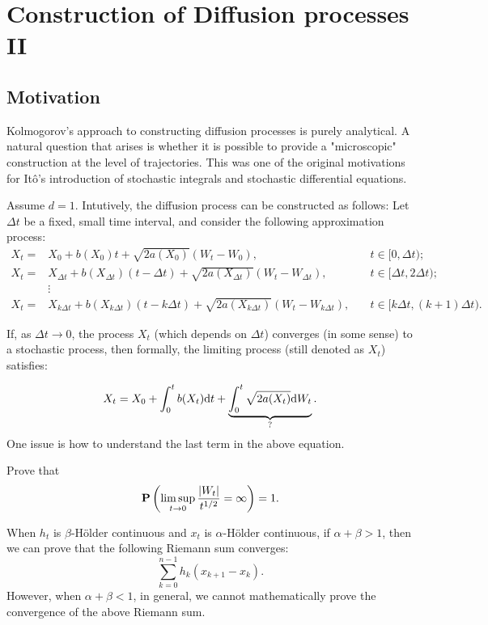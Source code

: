 \chapter{Construction of Diffusion processes II}


\section{Motivation} 
Kolmogorov's approach to constructing diffusion processes is purely analytical. A natural question that arises is whether it is possible to provide a "microscopic" construction at the level of trajectories. This was one of the original motivations for Itô's introduction of stochastic integrals and stochastic differential equations.

Assume \( d = 1 \). Intutively, the diffusion process can be constructed as follows: Let \( \Delta t \) be a fixed, small time interval, and consider the following approximation process: 
\begin{align*}
    X_t=&X_0+b(X_0)t+\sqrt{2a(X_0)}(W_t-W_0),&\quad t\in [0, \Delta t); \\
    X_t=&X_{\Delta t}+b(X_{\Delta t})(t-\Delta t)+\sqrt{2a(X_{\Delta t})}(W_t-W_{\Delta t}),&\quad t\in [\Delta t, 2 \Delta t); \\
    &\vdots\\
    X_t=&X_{k\Delta t}+b(X_{k\Delta t})(t-k\Delta t)+\sqrt{2a(X_{k\Delta t})}(W_t-W_{k \Delta t}),&\quad t\in [k\Delta t, (k+1)\Delta t). 
\end{align*}

If, as \(\Delta t \to 0\), the process \(X_t\) (which depends on \(\Delta t\)) converges (in some sense) to a stochastic process, then formally, the limiting process (still denoted as \(X_t\)) satisfies:

\begin{equation}\label{eq:sde0}
    X_t = X_0 + \int_0^t b(X_t) \text{\rm{d}} t + \underbrace{\int_0^t \sqrt{2a(X_t)} \text{\rm{d}} W_t}_{?}.
\end{equation}
One issue is how to understand the last term in the above equation. 

\begin{exercise}
    Prove that 
    \[
    {\mathbf P} \left( \limsup_{t\to 0}\frac{|W_t|}{t^{1/2}}=\infty \right)=1. 
    \]
\end{exercise}

\medskip

When \(h_t\) is \(\beta\)-Hölder continuous and \(x_t\) is \(\alpha\)-Hölder continuous, if \(\alpha + \beta > 1\), then we can prove that the following Riemann sum converges:
\[
    \sum_{k=0}^{n-1} h_k(x_{k+1} - x_k).
\]
However, when \(\alpha + \beta < 1\), in general, we cannot mathematically prove the convergence of the above Riemann sum. 


